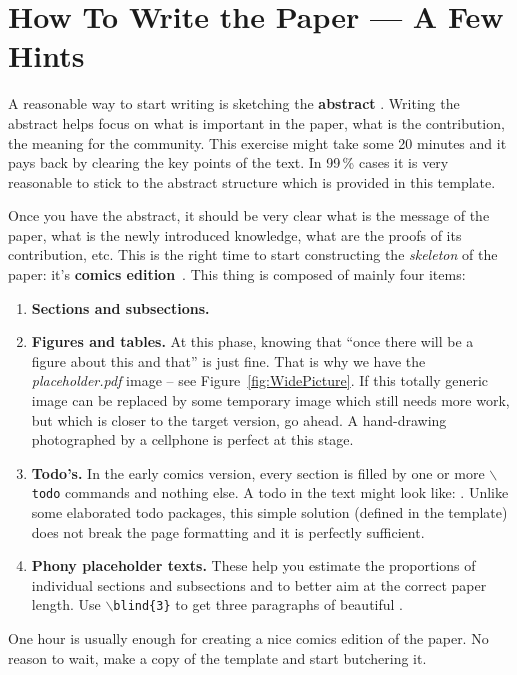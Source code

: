 \documentclass{ExcelAtFIT}
\begin{document}
\section{How To Write the Paper --- A Few Hints}
\label{sec:HowToWrite}

A reasonable way to start writing is sketching the \textbf{abstract} \cite{Herout-Abstract}.  Writing the abstract helps focus on what is important in the paper, what is the contribution, the meaning for the community.  This exercise might take some 20 minutes and it pays back by clearing the key points of the text.
In 99\,\% cases it is very reasonable to stick to the abstract structure \cite{Lebrun2011} which is provided in this template.

Once you have the abstract, it should be very clear what is the message of the paper, what is the newly introduced knowledge, what are the proofs of its contribution, etc.  This is the right time to start constructing the \emph{skeleton} of the paper: it's \textbf{comics edition}~\cite{Herout-Comics}.
This thing is composed of mainly four items:
\begin{enumerate} [noitemsep]
	\item \textbf{Sections and subsections.}
	\item \textbf{Figures and tables.}  At this phase, knowing that ``once there will be a figure about this and that'' is just fine.  That is why we have the \textit{placeholder.pdf} image -- see Figure~\ref{fig:WidePicture}.  If this totally generic image can be replaced by some temporary image which still needs more work, but which is closer to the target version, go ahead. A hand-drawing photographed by a cellphone is perfect at this stage.
	\item \textbf{Todo's.} In the early comics version, every section is filled by one or more \texttt{$\backslash$todo} commands and nothing else.  A todo in the text might look like: .  Unlike some elaborated todo packages, this simple solution (defined in the template) does not break the page formatting and it is perfectly sufficient.
	\item \textbf{Phony placeholder texts.}  These help you estimate the proportions of individual sections and subsections and to better aim at the correct paper length. Use \texttt{$\backslash$blind\{3\}} to get three paragraphs of beautiful .
\end{enumerate}
One hour is usually enough for creating a nice comics edition of the paper.  No reason to wait, make a copy of the template and start butchering it.
\end{document}
